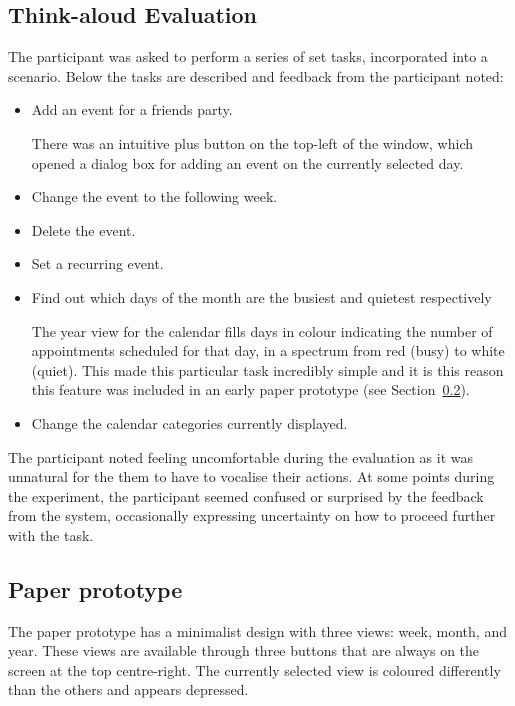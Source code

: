 \documentclass{article}
\begin{document}
\subsection{Think-aloud Evaluation}
The participant was asked to perform a series of set tasks, incorporated
into a scenario. Below the tasks are described and feedback from the
participant noted:

\begin{itemize}
\item Add an event for a friends party.

There was an intuitive plus button on the top-left of the window, which
opened a dialog box for adding an event on the currently selected day.

\item Change the event to the following week.

\item Delete the event.

\item Set a recurring event.

\item Find out which days of the month are the busiest and quietest
respectively

The year view for the calendar fills days in colour indicating the
number of appointments scheduled for that day, in a spectrum from
red (busy) to white (quiet). This made this particular task incredibly
simple and it is this reason this feature was included in an early
paper prototype (see Section~\ref{sec:osxpp}).

\item Change the calendar categories currently displayed.
\end{itemize}

The participant noted feeling uncomfortable during the evaluation as it
was unnatural for the them to have to vocalise their actions. At some
points during the experiment, the participant seemed confused or
surprised by the feedback from the system, occasionally expressing
uncertainty on how to proceed further with the task.

\subsection{Paper prototype}
\label{sec:osxpp}

The paper prototype has a minimalist design with three views: week,
month, and year. These views are available through three buttons that
are always on the screen at the top centre-right. The currently selected
view is coloured differently than the others and appears depressed.
\end{document}
